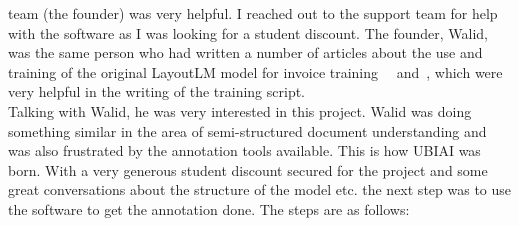team (the founder) was very helpful. I reached out to the support team for help with the software as I was
looking for a student discount. The founder, Walid, was the same person who had written a number of articles about
the use and training of the original LayoutLM model for invoice training~\autocite{EasyUseTexta}~\autocite{EasyUseTextb}
and~\autocite{amamouFineTuningLayoutLMV22022}, which were very helpful in the writing of the training script.\\
Talking with Walid, he was very interested in this project. Walid was doing something similar in the area of semi-structured
document understanding and was also frustrated by the annotation tools available. This is how UBIAI was born. With a very generous
student discount secured for the project and some great conversations about the structure of the model etc. the
next step was to use the software to get the annotation done.
\bigbreak
The steps are as follows:
